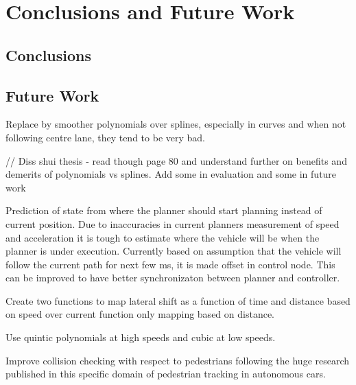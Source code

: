 \chapter{Conclusions and Future Work}
\label{conclusion}
\section{Conclusions}

\section{Future Work}
Replace by smoother polynomials over splines, especially in curves and when not following centre lane, they tend to be very bad. 

// Diss shui thesis - read though page 80 and understand further on benefits and demerits of polynomials vs splines. Add some in evaluation and some in future work


Prediction of state from where the planner should start planning instead of current position. 
Due to inaccuracies in current planners measurement of speed and acceleration it is tough to estimate where the vehicle will be when the planner is under execution. Currently based on assumption that the vehicle will follow the current path for next few ms, it is made offset in control node. This can be improved to have better synchronizaton between planner and controller. 


Create two functions to map lateral shift as a function of time and distance based on speed over current function only mapping based on distance.  

Use quintic polynomials at high speeds and cubic at low speeds. 

Improve collision checking with respect to pedestrians following the huge research published in this specific domain of pedestrian tracking in autonomous cars. 